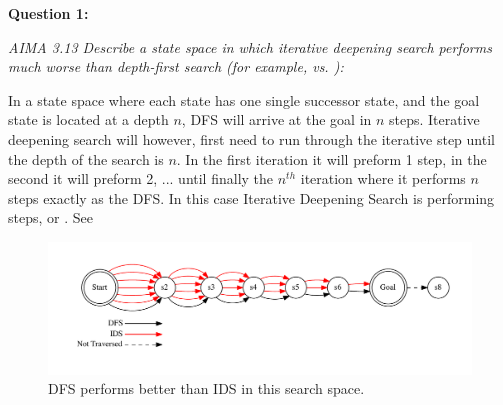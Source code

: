 \noindent\textbf{Question 1:}

\noindent\emph{AIMA 3.13 Describe a state space in which iterative deepening search performs much worse than depth-first search (for example,  vs. ):}

In a state space where each state has one single successor state, and the goal state is  located at a depth $n$, DFS will arrive at the goal in $n$ steps. Iterative deepening search will however, first need to run through the iterative step until the depth of the search is $n$. In the first iteration it will preform 1 step, in the second it will preform 2, ... until finally the $n^{th}$ iteration where it performs $n$ steps exactly as the DFS. In this case Iterative Deepening Search is performing  steps, or . See 

\begin{figure}[htbp]
  \centering
  \includegraphics[width=1.0\textwidth]{./media/dfs_vs_ids.pdf}
  \caption{ \label{Figure_1}DFS performs better than IDS in this search space.}
\end{figure}


